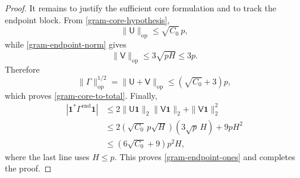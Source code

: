 \begin{proof}
It remains to justify the sufficient core formulation and to track the
endpoint block.  From \eqref{gram-core-hypothesis},
\[
 \|\mathsf U\|_{\mathrm{op}}\le\sqrt{C_0}\,p,
\]
while \eqref{gram-endpoint-norm} gives
\[
 \|\mathsf V\|_{\mathrm{op}}
 \le3\sqrt{pH}\le3p.
\]
Therefore
\[
 \|\Gamma\|_{\mathrm{op}}^{1/2}
 =\|\mathsf U+\mathsf V\|_{\mathrm{op}}
 \le(\sqrt{C_0}+3)p,
\]
which proves \eqref{gram-core-to-total}.
Finally,
\begin{align*}
 \left|\mathbf 1^*\Gamma^{\mathrm{end}}\mathbf 1\right|
 &\le2\|\mathsf U\mathbf 1\|_2
          \|\mathsf V\mathbf 1\|_2
       +\|\mathsf V\mathbf 1\|_2^2\\
 &\le2(\sqrt{C_0}\,p\sqrt H)(3\sqrt p\,H)
       +9pH^2\\
 &\le(6\sqrt{C_0}+9)p^2H,
\end{align*}
where the last line uses $H\le p$.  This proves
\eqref{gram-endpoint-ones} and completes the proof.
\end{proof}

